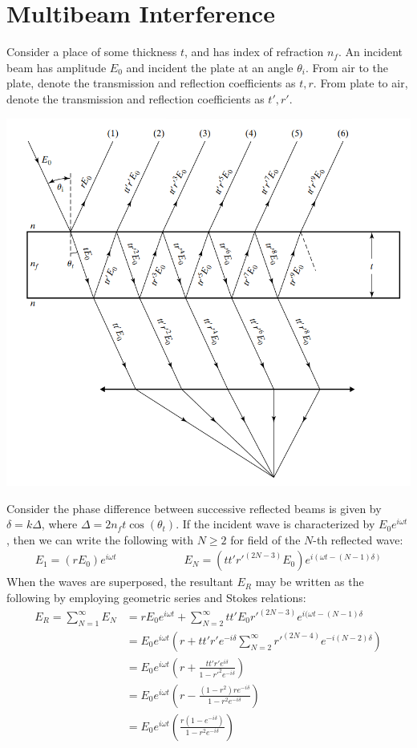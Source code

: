 \documentclass[11pt]{book}
\theoremstyle{break}
\theoremstyle{break}
\begin{document}
\section[Multibeam Interference]{\color{red}Multibeam Interference\color{black}}
Consider a place of some thickness $t$, and has index of refraction $n_f$. An incident beam has amplitude $E_0$ and incident the plate at an angle $\theta_i$. From air to the plate, denote the transmission and reflection coefficients as $t,r$. From plate to air, denote the transmission and reflection coefficients as $t',r'$. 
\begin{center}
\includegraphics[scale=0.80]{multiFilm.png}
\end{center}
Consider the phase difference between successive reflected beams is given by $\delta = k \Delta$, where $\Delta = 2n_f t \cos(\theta_t)$. If the incident wave is characterized by $E_0 e^{i\omega t}$, then we can write the following with $N\geq 2$ for field of the $N$-th reflected wave:
\begin{align*}
E_1 = (rE_0)e^{i\omega t} \qquad\qquad\qquad E_N = (tt'{r'}^{(2N-3)}E_0) e^{i(\omega t - (N-1)\delta)}
\end{align*}
When the waves are superposed, the resultant $E_R$ may be written as the following by employing geometric series and Stokes relations:
\begin{align*}
E_R = \sum_{N=1}^\infty E_N &= rE_0 e^{i\omega t} + \sum_{N=2}^\infty tt'E_0 {r'}^{(2N-3)}e^{i(\omega t - (N-1)\delta}\\
&= E_0 e^{i\omega t}\left( r + tt'r'e^{-i\delta}\sum_{N=2}^\infty {r'}^{(2N-4)} e^{-i(N-2) \delta}\right) \\
&= E_0 e^{i\omega t}\left( r + \frac{tt'{r'}e^{i\delta}}{1-{r'}^2e^{-i\delta}}\right)\\
&= E_0 e^{i\omega t}\left( r - \frac{(1-r^2) re^{-i\delta}}{1-r^2 e^{-i \delta}}\right)\\
&= E_0 e^{i\omega t}\left( \frac{r(1-e^{-i\delta})}{1-r^2 e^{-i\delta}}\right)
\end{align*}
\end{document}
